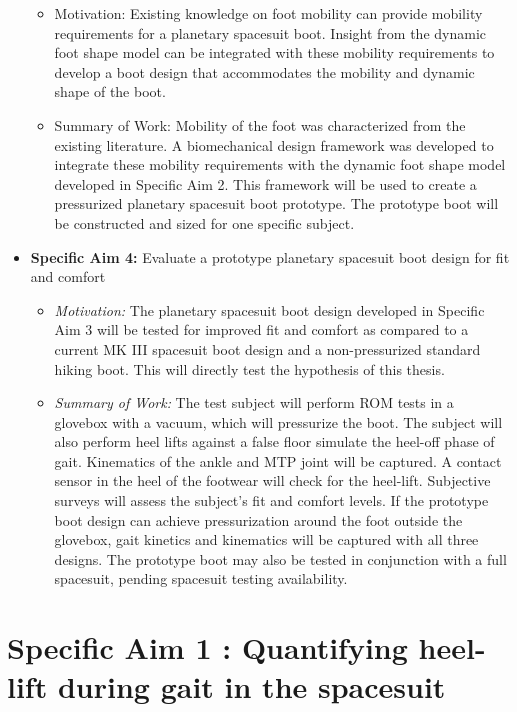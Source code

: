 \documentclass[defaultstyle,11pt]{comps}
\providecommand{\tightlist}{%
  \setlength{\itemsep}{0pt}\setlength{\parskip}{0pt}}
\begin{document}
\begin{itemize}
  \begin{itemize}
  \tightlist
  \item
    Motivation: Existing knowledge on foot mobility can provide mobility requirements for a planetary spacesuit boot. Insight from the dynamic foot shape model can be integrated with these mobility requirements to develop a boot design that accommodates the mobility and dynamic shape of the boot.
  \item
    Summary of Work: Mobility of the foot was characterized from the existing literature. A biomechanical design framework was developed to integrate these mobility requirements with the dynamic foot shape model developed in Specific Aim 2. This framework will be used to create a pressurized planetary spacesuit boot prototype. The prototype boot will be constructed and sized for one specific subject.
  \end{itemize}
\item
  \textbf{Specific Aim 4: } Evaluate a prototype planetary spacesuit boot design for fit and comfort

  \begin{itemize}
  \tightlist
  \item
    \emph{Motivation:} The planetary spacesuit boot design developed in Specific Aim 3 will be tested for improved fit and comfort as compared to a current MK III spacesuit boot design and a non-pressurized standard hiking boot. This will directly test the hypothesis of this thesis.
  \item
    \emph{Summary of Work:} The test subject will perform ROM tests in a glovebox with a vacuum, which will pressurize the boot. The subject will also perform heel lifts against a false floor simulate the heel-off phase of gait. Kinematics of the ankle and MTP joint will be captured. A contact sensor in the heel of the footwear will check for the heel-lift. Subjective surveys will assess the subject's fit and comfort levels. If the prototype boot design can achieve pressurization around the foot outside the glovebox, gait kinetics and kinematics will be captured with all three designs. The prototype boot may also be tested in conjunction with a full spacesuit, pending spacesuit testing availability.
  \end{itemize}
\end{itemize}

\hypertarget{specific-aim-1-quantifying-heel-lift-during-gait-in-the-spacesuit}{%
\chapter{Specific Aim 1 : Quantifying heel-lift during gait in the spacesuit}\label{specific-aim-1-quantifying-heel-lift-during-gait-in-the-spacesuit}}
\end{document}
